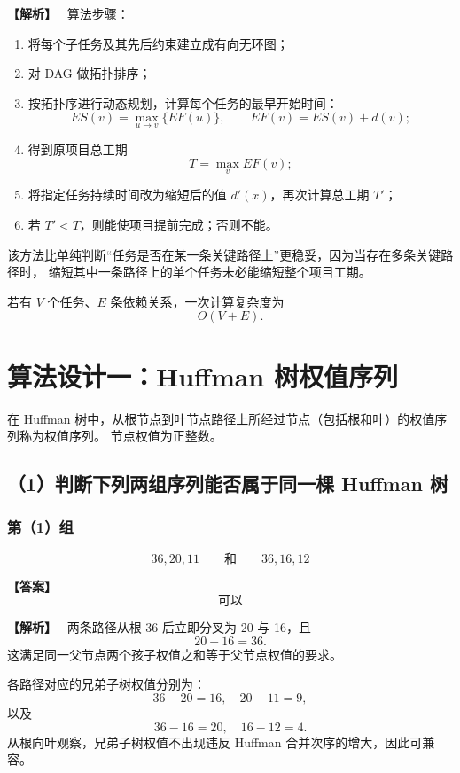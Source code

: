 \documentclass[12pt,a4paper]{ctexart}
\newenvironment{solution}
{\par\noindent\textbf{\color{answerblue}【解析】}\ }
{\par}
\newenvironment{answer}
{\par\noindent\textbf{\color{darkgreen}【答案】}\ }
{\par}
\begin{document}
\begin{solution}
算法步骤：

\begin{enumerate}
  \item 将每个子任务及其先后约束建立成有向无环图；
  \item 对 DAG 做拓扑排序；
  \item 按拓扑序进行动态规划，计算每个任务的最早开始时间：
  \[
  ES(v)=\max_{u\to v}\{EF(u)\},
  \qquad
  EF(v)=ES(v)+d(v);
  \]
  \item 得到原项目总工期
  \[
  T=\max_v EF(v);
  \]
  \item 将指定任务持续时间改为缩短后的值 $d'(x)$，再次计算总工期 $T'$；
  \item 若 $T'<T$，则能使项目提前完成；否则不能。
\end{enumerate}

该方法比单纯判断“任务是否在某一条关键路径上”更稳妥，因为当存在多条关键路径时，
缩短其中一条路径上的单个任务未必能缩短整个项目工期。

若有 $V$ 个任务、$E$ 条依赖关系，一次计算复杂度为
\[
\boxed{O(V+E)}.
\]
\end{solution}

\section{算法设计一：Huffman 树权值序列}

在 Huffman 树中，从根节点到叶节点路径上所经过节点（包括根和叶）的权值序列称为权值序列。
节点权值为正整数。

\subsection*{（1）判断下列两组序列能否属于同一棵 Huffman 树}

\subsubsection*{第（1）组}
\[
36,20,11
\qquad\text{和}\qquad
36,16,12
\]

\begin{answer}
\[
\boxed{\text{可以}}
\]
\end{answer}

\begin{solution}
两条路径从根 36 后立即分叉为 20 与 16，且
\[
20+16=36.
\]
这满足同一父节点两个孩子权值之和等于父节点权值的要求。

各路径对应的兄弟子树权值分别为：
\[
36-20=16,\quad 20-11=9,
\]
以及
\[
36-16=20,\quad 16-12=4.
\]
从根向叶观察，兄弟子树权值不出现违反 Huffman 合并次序的增大，因此可兼容。
\end{solution}
\end{document}
